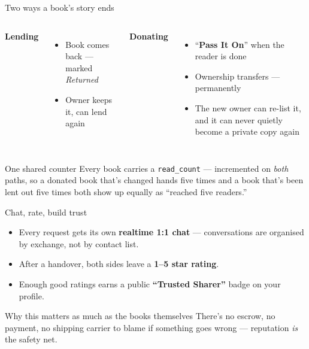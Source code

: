 \documentclass[aspectratio=169,11pt]{beamer}
\newcommand{\code}[1]{\textcolor{olkTealDark}{\texttt{#1}}}
\begin{document}
\begin{frame}{Two ways a book's story ends}
  \begin{columns}[T]
    \textbf{Lending}
    \begin{itemize}
      \item Book comes back --- marked \emph{Returned}
      \item Owner keeps it, can lend again
    \end{itemize}
    \textbf{Donating}
    \begin{itemize}
      \item ``\textbf{Pass It On}'' when the reader is done
      \item Ownership transfers --- permanently
      \item The new owner can re-list it, and it can never quietly become a private copy again
    \end{itemize}
  \end{columns}
  \vfill
  \begin{block}{One shared counter}
    Every book carries a \code{read\_count} --- incremented on \emph{both} paths, so a donated book that's changed hands five times and a book that's been lent out five times both show up equally as ``reached five readers.''
  \end{block}
\end{frame}

\begin{frame}{Chat, rate, build trust}
  \begin{itemize}
    \item Every request gets its own \textbf{realtime 1:1 chat} --- conversations are organised by exchange, not by contact list.
    \item After a handover, both sides leave a \textbf{1--5 star rating}.
    \item Enough good ratings earns a public \textbf{``Trusted Sharer''} badge on your profile.
  \end{itemize}
  \vfill
  \begin{alertblock}{Why this matters as much as the books themselves}
    There's no escrow, no payment, no shipping carrier to blame if something goes wrong --- reputation \emph{is} the safety net.
  \end{alertblock}
\end{frame}
\end{document}
